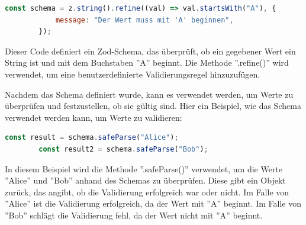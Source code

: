         \begin{lstlisting}[language=JavaScript]
        const schema = z.string().refine((val) => val.startsWith("A"), {  
            message: "Der Wert muss mit 'A' beginnen",
        });
        \end{lstlisting}
        
        Dieser Code definiert ein Zod-Schema, das überprüft, ob ein gegebener Wert ein String ist und mit dem Buchstaben ''A'' beginnt. Die Methode ''.refine()'' wird verwendet, um eine benutzerdefinierte Validierungsregel hinzuzufügen.
        
        Nachdem das Schema definiert wurde, kann es verwendet werden, um Werte zu überprüfen und festzustellen, ob sie gültig sind. Hier ein Beispiel, wie das Schema verwendet werden kann, um Werte zu validieren:
        
        \begin{lstlisting}[language=JavaScript]
        const result = schema.safeParse("Alice");  
        const result2 = schema.safeParse("Bob"); 
        \end{lstlisting}
        
        In diesem Beispiel wird die Methode ''.safeParse()'' verwendet, um die Werte ''Alice'' und ''Bob'' anhand des Schemas zu überprüfen. Diese gibt ein Objekt zurück, das angibt, ob die Validierung erfolgreich war oder nicht. Im Falle von ''Alice'' ist die Validierung erfolgreich, da der Wert mit ''A'' beginnt. Im Falle von ''Bob'' schlägt die Validierung fehl, da der Wert nicht mit ''A'' beginnt.
